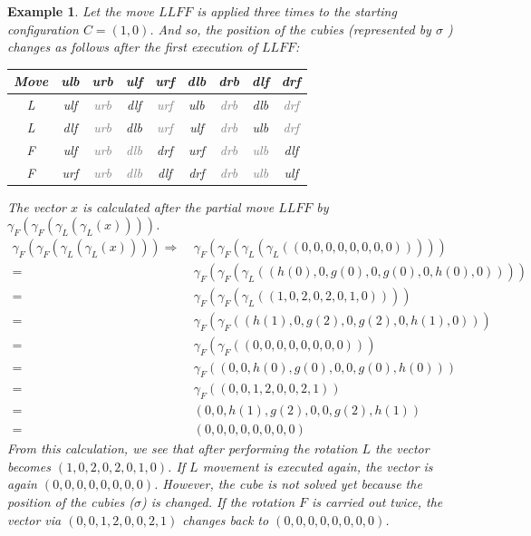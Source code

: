 \documentclass[12pt,a4paper]{article}
\theoremstyle{custom}
\newtheorem*{example}{Example}
\begin{document}
\begin{example}
Let the move $LLFF$ is applied three times to the starting configuration $C=(1,0)$. 
And so, the position of the cubies (represented by $\sigma$ ) changes as follows after the first execution of $LLFF$:

\begin{center}
\begin{tabular}{ccccccccc}
\toprule
\textbf{Move} & \textbf{ulb} & \textbf{urb} & \textbf{ulf} & \textbf{urf} & \textbf{dlb} & \textbf{drb} & \textbf{dlf} & \textbf{drf} \\
\midrule

L & ulf & \textcolor{gray}{urb} & dlf & \textcolor{gray}{urf} & ulb & \textcolor{gray}{drb} & dlb & \textcolor{gray}{drf} \\

L & dlf & \textcolor{gray}{urb} & dlb & \textcolor{gray}{urf} & ulf & \textcolor{gray}{drb} & ulb & \textcolor{gray}{drf} \\

F & ulf & \textcolor{gray}{urb} & \textcolor{gray}{dlb} & drf & urf & \textcolor{gray}{drb} & \textcolor{gray}{ulb} & dlf \\

F & urf & \textcolor{gray}{urb} & \textcolor{gray}{dlb} & dlf & drf & \textcolor{gray}{drb} & \textcolor{gray}{ulb} & ulf \\
\bottomrule
\end{tabular}
\end{center}
The vector $x$ is calculated after the partial move $LLFF$ by $\gamma_F(\gamma_F(\gamma_L(\gamma_L(x))))$.  
\begin{align*}
 \gamma_F(\gamma_F(\gamma_L(\gamma_L(x)))) \Rightarrow \ & \gamma_F(\gamma_F(\gamma_L(\gamma_L((0,0,0,0,0,0,0,0))))) \\
= \ & \gamma_F(\gamma_F(\gamma_L((h(0),0,g(0),0,g(0),0,h(0),0)))) \\
= \ & \gamma_F(\gamma_F(\gamma_L((1,0,2,0,2,0,1,0)))) \\
= \ & \gamma_F(\gamma_F((h(1),0,g(2),0,g(2),0,h(1),0))) \\
= \ & \gamma_F(\gamma_F((0,0,0,0,0,0,0,0))) \\
= \ & \gamma_F((0,0,h(0),g(0),0,0,g(0),h(0))) \\
= \ & \gamma_F((0,0,1,2,0,0,2,1)) \\
= \ & (0,0,h(1),g(2),0,0,g(2),h(1)) \\
= \ & (0,0,0,0,0,0,0,0)
\end{align*}
From this calculation, we see that after performing the rotation $L$ the vector becomes $(1,0,2,0,2,0,1,0)$. If $L$ movement is executed again, the vector is again $(0,0,0,0,0,0,0,0)$. However, the cube is not solved yet because the position of the cubies ($\sigma$) is changed.
If the rotation $F$ is carried out twice, the vector via $(0,0,1,2,0,0,2,1)$ changes back to $(0,0,0,0,0,0, 0,0)$.


\end{example}
\end{document}
